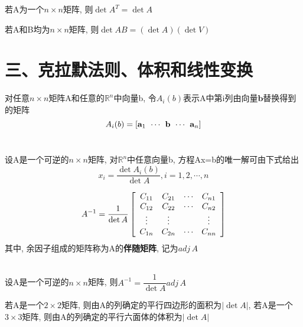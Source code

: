\begin{theorem}
若A为一个$n\times n$矩阵, 则$\det A^T=\det A$
\end{theorem}\vspace{4ex}

\begin{theorem}[乘法的性质]
若A和B均为$n\times n$矩阵, 则$\det AB=(\det A)(\det V)$
\end{theorem}\vspace{8ex}

\section{三、克拉默法则、体积和线性变换}
对任意$n\times n$矩阵A和任意的$\mathbb{R}^n$中向量b, 令$A_i(b)$表示A中第i列由向量$\mathbf{b}$替换得到的矩阵
\[A_i(b)=[\mathbf{a}_1\hspace{1ex}\cdots\hspace{1ex}\mathbf{b}\hspace{1ex}\cdots\hspace{1ex}\mathbf{a}_n]\]\\[-1ex]

\begin{theorem}[克拉默法则]
设A是一个可逆的$n\times n$矩阵, 对$\mathbb{R}^n$中任意向量b, 方程Ax=b的唯一解可由下式给出
\[x_i=\frac{\det A_i(b)}{\det A},i=1,2,\cdots,n\]
\end{theorem}\vspace{4ex}

\[A^{-1}=\frac{1}{\det A}\left[\begin{array}{c c c c}
C_{11} & C_{21} & \cdots & C_{n1}\\
C_{12} & C_{22} & \cdots & C_{n2}\\
\vdots & \vdots & & \vdots\\
C_{1n} & C_{2n} & \cdots & C_{nn}
\end{array}\right]\]
其中, 余因子组成的矩阵称为A的\textbf{伴随矩阵}, 记为$adj\,A$\\[2ex]

\begin{theorem}[逆矩阵公式]\ \\
设A是一个可逆的$n\times n$矩阵, 则$A^{-1}=\dfrac{1}{\det A}adj\,A$
\end{theorem}\vspace{4ex}

\begin{theorem}
若A是一个$2\times 2$矩阵, 则由A的列确定的平行四边形的面积为$|\det A|$, 若A是一个$3\times 3$矩阵, 则由A的列确定的平行六面体的体积为$|\det A|$
\end{theorem}\vspace{4ex}


